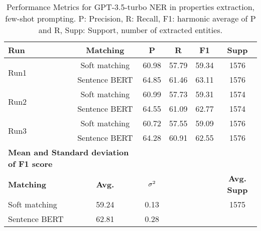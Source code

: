 \begin{table}[htbp]
\small
  \centering
  \caption{Performance Metrics for GPT-3.5-turbo NER in properties extraction, few-shot prompting. P: Precision, R: Recall, F1: harmonic average of P and R, Supp: Support, number of extracted entities.}
  \begin{tabular}{lccccc}
    \toprule
    \textbf{Run} & \textbf{Matching} & \textbf{P} & \textbf{R} & \textbf{F1} & \textbf{Supp} \\
    \midrule
    \multirow{2}{*}{Run1} & Soft matching & 60.98 & 57.79 & 59.34 & 1576 \\
    & Sentence BERT & 64.85 & 61.46 & 63.11 & 1576 \\    
    \midrule
    \multirow{2}{*}{Run2} & Soft matching & 60.99 & 57.73 & 59.31 & 1574 \\
    & Sentence BERT & 64.55 & 61.09 & 62.77 & 1574 \\
    \midrule
    \multirow{2}{*}{Run3} & Soft matching & 60.72 & 57.55 & 59.09 & 1576 \\
    & Sentence BERT & 64.28 & 60.91 & 62.55 & 1576 \\
    \midrule
    \multicolumn{2}{l}{\textbf{Mean and Standard deviation of F1 score}} & & & & \\
    \midrule
    \textbf{Matching} & \textbf{Avg.} & $\sigma\textsuperscript{2}$ & & & \textbf{Avg. Supp}\\
    Soft matching & 59.24 & 0.13 & & & 1575 \\
    Sentence BERT & 62.81 & 0.28 & & & \\
    \bottomrule
  \end{tabular}
\end{table}

